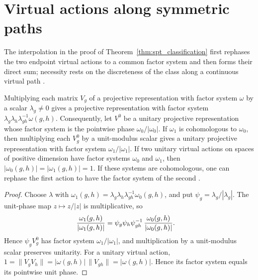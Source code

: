 \section{Virtual actions along symmetric paths}
\label{sec:spt_virtual_path_algebra}

The interpolation in the proof of Theorem~\ref{thm:spt_classification} first
rephases the two endpoint virtual actions to a common factor system and then forms
their direct sum; necessity rests on the discreteness of the class along a
continuous virtual path \cite[Section~II.F.2]{Schuch2011Phases}.

\begin{lemma}
    \label{thm:spt_unitary_rephasing}
    \leanok
    Multiplying each matrix $V_g$ of a projective representation with factor system
    $\omega$ by a scalar $\lambda_g\neq0$ gives a projective representation with
    factor system $\lambda_g\lambda_h\lambda_{gh}^{-1}\omega(g,h)$.  Consequently, let
    $V^0$ be a unitary projective representation whose factor system is the
    pointwise phase $\omega_0/|\omega_0|$.  If $\omega_1$ is cohomologous to
    $\omega_0$, then multiplying each $V_g^0$ by a unit-modulus scalar gives a unitary
    projective representation with factor system $\omega_1/|\omega_1|$.
    If two unitary virtual actions on spaces of positive dimension have factor
    systems $\omega_0$ and $\omega_1$, then $|\omega_0(g,h)|=|\omega_1(g,h)|=1$.
    If these systems are cohomologous, one can rephase the first action
    to have the factor system of the second
    \cite[Section~II.F.2, lines~886--921]{Schuch2011Phases}.
\end{lemma}

\begin{proof}\leanok
    Choose $\lambda$ with
    $\omega_1(g,h)=\lambda_g\lambda_h\lambda_{gh}^{-1}\omega_0(g,h)$, and put
    $\psi_g=\lambda_g/|\lambda_g|$.  The unit-phase map $z\mapsto z/|z|$ is
    multiplicative, so
    \begin{align}
        \frac{\omega_1(g,h)}{|\omega_1(g,h)|}
         & =\psi_g\psi_h\psi_{gh}^{-1}\,\frac{\omega_0(g,h)}{|\omega_0(g,h)|}.
        \notag
    \end{align}
    Hence $\psi_gV_g^0$ has factor system $\omega_1/|\omega_1|$, and multiplication
    by a unit-modulus scalar preserves unitarity.
    For a unitary virtual action,
    $1=\|V_gV_h\|=|\omega(g,h)|\,\|V_{gh}\|=|\omega(g,h)|$.
    Hence its factor system equals its pointwise unit phase.
\end{proof}

